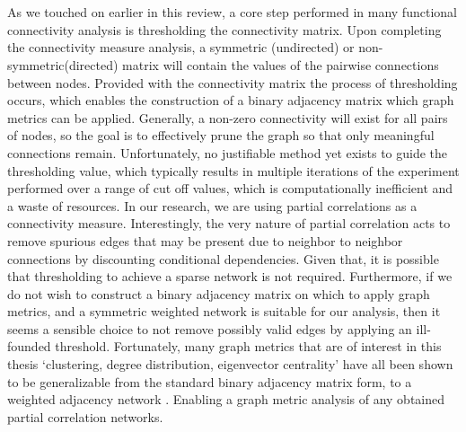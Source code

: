 \documentclass[11pt]{article}
\begin{document}
\\
\\
As we touched on earlier in this review, a core step performed in many functional connectivity analysis is thresholding the connectivity matrix. Upon completing the connectivity measure analysis, a symmetric (undirected) or non-symmetric(directed) matrix will contain the values of the pairwise connections between nodes. Provided with the connectivity matrix the process of thresholding occurs, which enables the construction of a binary adjacency matrix which graph metrics can be applied. Generally, a non-zero connectivity will exist for all pairs of nodes, so the goal is to effectively prune the graph so that only meaningful connections remain. Unfortunately, no justifiable method yet exists to guide the thresholding value, which typically results in multiple iterations of the experiment performed over a range of cut off values, which is computationally inefficient and a waste of resources. In our research, we are using partial correlations as a connectivity measure. Interestingly, the very nature of partial correlation acts to remove spurious edges that may be present due to neighbor to neighbor connections by discounting conditional dependencies. Given that, it is possible that thresholding to achieve a sparse network is not required. Furthermore, if we do not wish to construct a binary adjacency matrix on which to apply graph metrics, and a symmetric weighted network is suitable for our analysis, then it seems a sensible choice to not remove possibly valid edges by applying an ill-founded threshold. Fortunately, many graph metrics that are of interest in this thesis `clustering, degree distribution, eigenvector centrality' have all been shown to be generalizable from the standard binary adjacency matrix form, to a weighted adjacency network \citep{fornito2013graph, wn2, wnsal}. Enabling a graph metric analysis of any obtained partial correlation networks. 

\pagebreak

%


\end{document}
